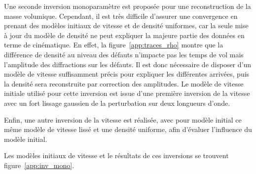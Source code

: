Une seconde inversion monoparamètre est proposée pour une reconstruction de la masse volumique. Cependant, il est très difficile d'assurer une convergence en prenant des modèles initiaux de vitesse et de densité uniformes, car la seule mise à jour du modèle de densité ne peut expliquer la majeure partie des données en terme de cinématique. En effet, la figure~\ref{app:traces_rho} montre que la différence de densité au niveau des défauts n'impacte pas les temps de vol mais l'amplitude des diffractions sur les défauts. Il est donc nécessaire de disposer d'un modèle de vitesse suffisamment précis pour expliquer les différentes arrivées, puis la densité sera reconstruite par correction des amplitudes. Le modèle de vitesse initiale utilisé pour cette inversion est issue d'une première inversion de la vitesse avec un fort lissage gaussien de la perturbation sur deux longueurs d'onde.

Enfin, une autre inversion de la vitesse est réalisée, avec pour modèle initial ce même modèle de vitesse lissé et une densité uniforme, afin d'évaluer l'influence du modèle initial.

Les modèles initiaux de vitesse et le résultats de ces inversions se trouvent figure~\ref{app:inv_mono}. 


